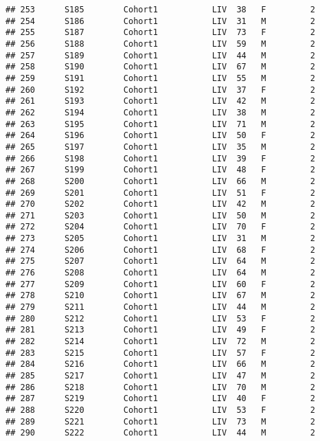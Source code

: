 \documentclass[
]{article}
\begin{document}
\begin{verbatim}
## 253      S185        Cohort1           LIV  38   F         2      
## 254      S186        Cohort1           LIV  31   M         2      
## 255      S187        Cohort1           LIV  73   F         2      
## 256      S188        Cohort1           LIV  59   M         2      
## 257      S189        Cohort1           LIV  44   M         2      
## 258      S190        Cohort1           LIV  67   M         2      
## 259      S191        Cohort1           LIV  55   M         2      
## 260      S192        Cohort1           LIV  37   F         2      
## 261      S193        Cohort1           LIV  42   M         2      
## 262      S194        Cohort1           LIV  38   M         2      
## 263      S195        Cohort1           LIV  71   M         2      
## 264      S196        Cohort1           LIV  50   F         2      
## 265      S197        Cohort1           LIV  35   M         2      
## 266      S198        Cohort1           LIV  39   F         2      
## 267      S199        Cohort1           LIV  48   F         2      
## 268      S200        Cohort1           LIV  66   M         2      
## 269      S201        Cohort1           LIV  51   F         2      
## 270      S202        Cohort1           LIV  42   M         2      
## 271      S203        Cohort1           LIV  50   M         2      
## 272      S204        Cohort1           LIV  70   F         2      
## 273      S205        Cohort1           LIV  31   M         2      
## 274      S206        Cohort1           LIV  68   F         2      
## 275      S207        Cohort1           LIV  64   M         2      
## 276      S208        Cohort1           LIV  64   M         2      
## 277      S209        Cohort1           LIV  60   F         2      
## 278      S210        Cohort1           LIV  67   M         2      
## 279      S211        Cohort1           LIV  44   M         2      
## 280      S212        Cohort1           LIV  53   F         2      
## 281      S213        Cohort1           LIV  49   F         2      
## 282      S214        Cohort1           LIV  72   M         2      
## 283      S215        Cohort1           LIV  57   F         2      
## 284      S216        Cohort1           LIV  66   M         2      
## 285      S217        Cohort1           LIV  47   M         2      
## 286      S218        Cohort1           LIV  70   M         2      
## 287      S219        Cohort1           LIV  40   F         2      
## 288      S220        Cohort1           LIV  53   F         2      
## 289      S221        Cohort1           LIV  73   M         2      
## 290      S222        Cohort1           LIV  44   M         2      

\end{verbatim}
\end{document}
